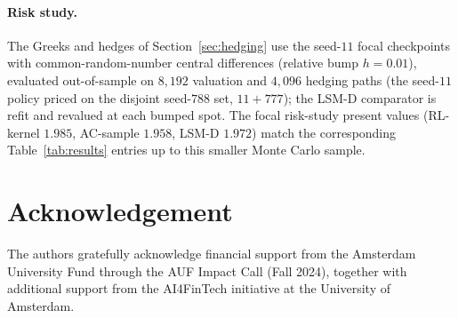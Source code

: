 \documentclass[a4paper,fleqn]{cas-dc}
\begin{document}
\paragraph{Risk study.} The Greeks and hedges of Section~\ref{sec:hedging} use the seed-$11$ focal checkpoints with common-random-number central differences (relative bump $h=0.01$), evaluated out-of-sample on $8{,}192$ valuation and $4{,}096$ hedging paths (the seed-$11$ policy priced on the disjoint seed-$788$ set, $11+777$); the LSM-D comparator is refit and revalued at each bumped spot. The focal risk-study present values (RL-kernel $1.985$, AC-sample $1.958$, LSM-D $1.972$) match the corresponding Table~\ref{tab:results} entries up to this smaller Monte Carlo sample.

\clearpage

\section*{Acknowledgement}

The authors gratefully acknowledge financial support from the Amsterdam University Fund through the AUF Impact Call (Fall 2024), together with additional support from the AI4FinTech initiative at the University of Amsterdam.



\end{document}
